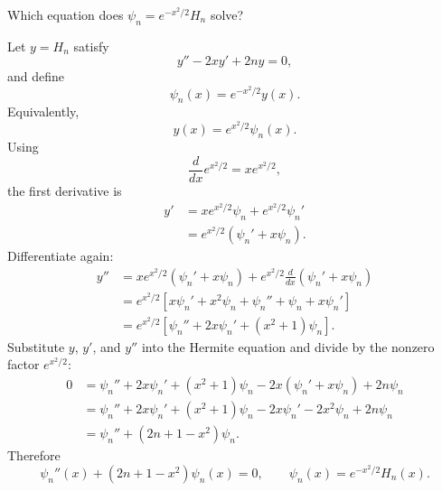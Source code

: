 \documentclass[11pt]{beamer}
\begin{document}
\begin{frame}[allowframebreaks]{Which equation does $\psi_n=e^{-x^2/2}H_n$ solve?}
\footnotesize

Let $y=H_n$ satisfy
\[
  y''-2xy'+2ny=0,
\]
and define
\[
  \psi_n(x)=e^{-x^2/2}y(x).
\]
Equivalently,
\[
  y(x)=e^{x^2/2}\psi_n(x).
\]
Using
\[
  \frac{d}{dx}e^{x^2/2}=xe^{x^2/2},
\]
the first derivative is
\begin{align*}
  y'
  &=xe^{x^2/2}\psi_n+e^{x^2/2}\psi_n'\\
  &=e^{x^2/2}(\psi_n'+x\psi_n).
\end{align*}
Differentiate again:
\begin{align*}
  y''
  &=xe^{x^2/2}(\psi_n'+x\psi_n)
    +e^{x^2/2}\frac{d}{dx}(\psi_n'+x\psi_n)\\
  &=e^{x^2/2}\left[x\psi_n'+x^2\psi_n
    +\psi_n''+\psi_n+x\psi_n'\right]\\
  &=e^{x^2/2}\left[\psi_n''+2x\psi_n'+(x^2+1)\psi_n\right].
\end{align*}
Substitute $y$, $y'$, and $y''$ into the Hermite equation and divide by the nonzero factor
$e^{x^2/2}$:
\begin{align*}
  0
  &=\psi_n''+2x\psi_n'+(x^2+1)\psi_n
    -2x(\psi_n'+x\psi_n)+2n\psi_n\\
  &=\psi_n''+2x\psi_n'+(x^2+1)\psi_n
    -2x\psi_n'-2x^2\psi_n+2n\psi_n\\
  &=\psi_n''+(2n+1-x^2)\psi_n.
\end{align*}
Therefore
\begin{equation}
  \psi_n''(x)+(2n+1-x^2)\psi_n(x)=0,
  \qquad
  \psi_n(x)=e^{-x^2/2}H_n(x).
  \label{eq:hermite-osc}
\end{equation}
\end{frame}
\end{document}
